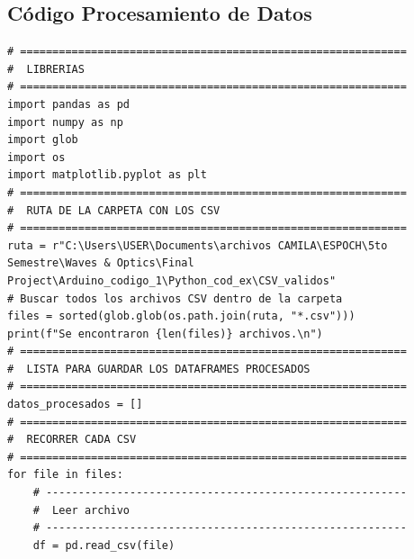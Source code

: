 \documentclass[10pt]{article}
\begin{document}
\subsection{Código Procesamiento de Datos}
\begin{lstlisting}
# ============================================================
#  LIBRERIAS
# ============================================================
import pandas as pd
import numpy as np
import glob
import os
import matplotlib.pyplot as plt
# ============================================================
#  RUTA DE LA CARPETA CON LOS CSV
# ============================================================
ruta = r"C:\Users\USER\Documents\archivos CAMILA\ESPOCH\5to Semestre\Waves & Optics\Final Project\Arduino_codigo_1\Python_cod_ex\CSV_validos"
# Buscar todos los archivos CSV dentro de la carpeta
files = sorted(glob.glob(os.path.join(ruta, "*.csv")))
print(f"Se encontraron {len(files)} archivos.\n")
# ============================================================
#  LISTA PARA GUARDAR LOS DATAFRAMES PROCESADOS
# ============================================================
datos_procesados = []
# ============================================================
#  RECORRER CADA CSV
# ============================================================
for file in files:
    # --------------------------------------------------------
    #  Leer archivo
    # --------------------------------------------------------
    df = pd.read_csv(file)


\end{lstlisting}
\end{document}
